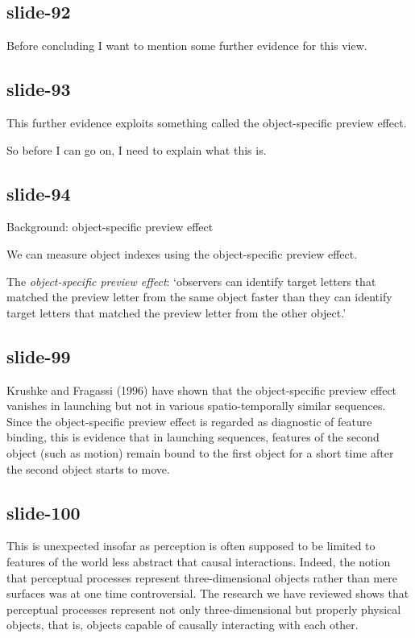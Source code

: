 \documentclass[12pt,\papersize]{extarticle}
\begin{document}
\subsection{slide-92}
Before concluding I want to mention some further evidence for this view.
 
\subsection{slide-93}
This further evidence exploits something called the object-specific preview effect.
 
So before I can go on, I need to explain what this is.
 
\subsection{slide-94}
Background: object-specific preview effect
 
We can measure object indexes using the object-specific preview effect.
 
The \emph{object-specific preview effect}: ‘observers can identify target letters that matched the preview letter from the same object faster than they can identify target letters that matched the preview letter from the other object.’
\citep[p.\ 2]{Krushke:1996ge}
 
\subsection{slide-99}
Krushke and Fragassi (1996) have shown that the object-specific preview effect vanishes 
in launching but not in various spatio-temporally similar sequences.  Since the object-specific 
preview effect is regarded as diagnostic of feature binding, this is evidence that in launching 
sequences, features of the second object (such as motion) remain bound to the first object for 
a short time after the second object starts to move.
 
\subsection{slide-100}
This is unexpected insofar as perception is often supposed to be limited to features of the 
world less abstract that causal interactions.  Indeed, the notion that perceptual processes
represent three-dimensional objects rather than mere surfaces was at one time controversial.
The research we have reviewed shows that perceptual processes represent not only 
three-dimensional but properly physical objects, that is, objects capable of causally
interacting with each other.
 
\end{document}
